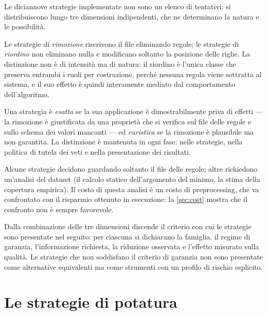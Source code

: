 Le diciannove strategie implementate non sono un elenco di tentativi: si distribuiscono lungo tre
dimensioni indipendenti, che ne determinano la natura e le possibilità.

\begin{description}[leftmargin=1.4em]
    \item[Che cosa cambiano.] Le strategie di \emph{rimozione} riscrivono il file eliminando
    regole; le strategie di \emph{riordino} non eliminano nulla e modificano soltanto la posizione
    delle righe. La distinzione non è di intensità ma di natura: il riordino è l'unica classe che
    preserva entrambi i ruoli per costruzione, perché nessuna regola viene sottratta al sistema, e
    il suo effetto è quindi interamente mediato dal comportamento dell'algoritmo.
    \item[Che cosa garantiscono.] Una strategia è \emph{esatta} se la sua applicazione è
    dimostrabilmente priva di effetti --- la rimozione è giustificata da una proprietà che si
    verifica sul file delle regole e sullo schema dei valori mancanti --- ed \emph{euristica} se
    la rimozione è plausibile ma non garantita. La distinzione è mantenuta in ogni fase: nelle
    strategie, nella politica di tutela dei veti e nella presentazione dei risultati.
    \item[Che informazione richiedono.] Alcune strategie decidono guardando soltanto il file delle
    regole; altre richiedono un'analisi del dataset (il calcolo statico dell'argomento del minimo,
    la stima della copertura empirica). Il costo di questa analisi è un costo di preprocessing, che
    va confrontato con il risparmio ottenuto in esecuzione: la \autoref{sec:cost} mostra che il
    confronto non è sempre favorevole.
\end{description}

Dalla combinazione delle tre dimensioni discende il criterio con cui le strategie sono presentate
nel seguito: per ciascuna si dichiarano la famiglia, il regime di garanzia, l'informazione
richiesta, la riduzione osservata e l'effetto misurato sulla qualità. Le strategie che non
soddisfano il criterio di garanzia non sono presentate come alternative equivalenti ma come
strumenti con un profilo di rischio esplicito.

\section{Le strategie di potatura}\label{sec:strategies}

